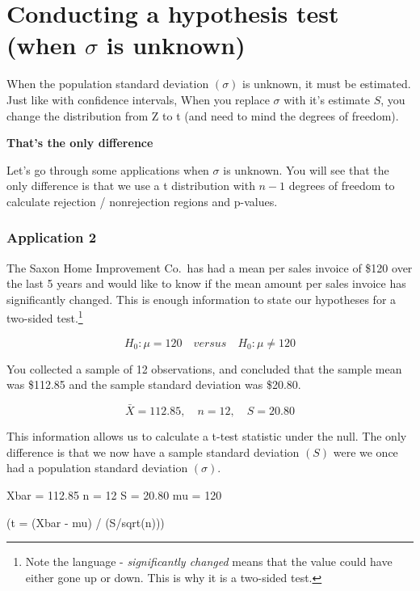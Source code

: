 \documentclass[
]{book}
\newenvironment{Shaded}{\begin{snugshade}}{\end{snugshade}}
\newcommand{\AttributeTok}[1]{\textcolor[rgb]{0.77,0.63,0.00}{#1}}
\newcommand{\DecValTok}[1]{\textcolor[rgb]{0.00,0.00,0.81}{#1}}
\newcommand{\FloatTok}[1]{\textcolor[rgb]{0.00,0.00,0.81}{#1}}
\newcommand{\FunctionTok}[1]{\textcolor[rgb]{0.00,0.00,0.00}{#1}}
\newcommand{\NormalTok}[1]{#1}
\newcommand{\OtherTok}[1]{\textcolor[rgb]{0.56,0.35,0.01}{#1}}
\newcommand{\SpecialCharTok}[1]{\textcolor[rgb]{0.00,0.00,0.00}{#1}}
\begin{document}
\hypertarget{conducting-a-hypothesis-test-when-sigma-is-unknown}{%
\section{\texorpdfstring{Conducting a hypothesis test (when \(\sigma\) is unknown)}{Conducting a hypothesis test (when \textbackslash sigma is unknown)}}\label{conducting-a-hypothesis-test-when-sigma-is-unknown}}

When the population standard deviation \((\sigma)\) is unknown, it must be estimated. Just like with confidence intervals, When you replace \(\sigma\) with it's estimate \(S\), you change the distribution from Z to t (and need to mind the degrees of freedom).

\textbf{That's the only difference}

Let's go through some applications when \(\sigma\) is unknown. You will see that the only difference is that we use a t distribution with \(n-1\) degrees of freedom to calculate rejection / nonrejection regions and p-values.

\hypertarget{application-2-1}{%
\subsubsection*{Application 2}\label{application-2-1}}

The Saxon Home Improvement Co.~has had a mean per sales invoice of \$120 over the last 5 years and would like to know if the mean amount per sales invoice has significantly changed. This is enough information to state our hypotheses for a two-sided test.\footnote{Note the language - \emph{significantly changed} means that the value could have either gone up or down. This is why it is a two-sided test.}

\[H_0:\mu=120 \quad versus \quad H_0:\mu \neq 120\]

You collected a sample of 12 observations, and concluded that the sample mean was \$112.85 and the sample standard deviation was \$20.80.

\[\bar{X}=112.85, \quad n=12, \quad S=20.80\]

This information allows us to calculate a t-test statistic under the null. The only difference is that we now have a sample standard deviation \((S)\) were we once had a population standard deviation \((\sigma)\).

\begin{Shaded}
\begin{Highlighting}[]
\NormalTok{Xbar }\OtherTok{=} \FloatTok{112.85}
\NormalTok{n }\OtherTok{=} \DecValTok{12}
\NormalTok{S }\OtherTok{=} \FloatTok{20.80}
\NormalTok{mu }\OtherTok{=} \DecValTok{120}

\NormalTok{(}\AttributeTok{t =}\NormalTok{ (Xbar }\SpecialCharTok{{-}}\NormalTok{ mu) }\SpecialCharTok{/}\NormalTok{ (S}\SpecialCharTok{/}\FunctionTok{sqrt}\NormalTok{(n)))}
\end{Highlighting}
\end{Shaded}
\end{document}
